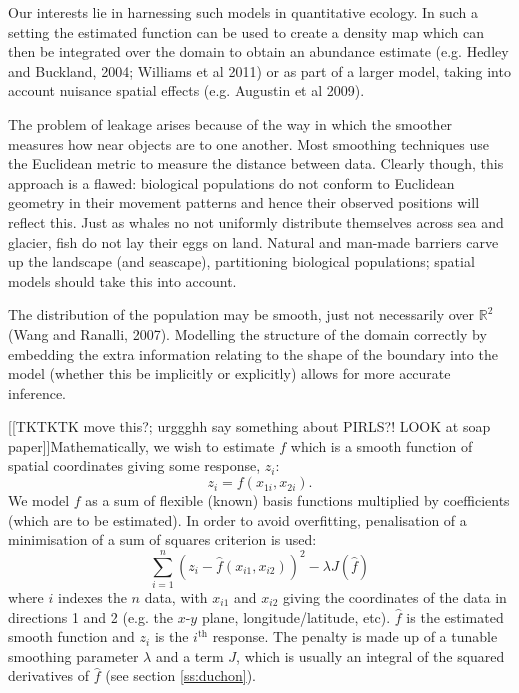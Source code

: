 \documentclass[useAMS, referee]{biom}
\begin{document}
Our interests lie in harnessing such models in quantitative ecology. In such a setting the estimated function can be used to create a density map which can then be integrated over the domain to obtain an abundance estimate (e.g. Hedley and Buckland, 2004; Williams et al 2011) or as part of a larger model, taking into account nuisance spatial effects (e.g. Augustin et al 2009). 


The problem of leakage arises because of the way in which the smoother measures how near objects are to one another. Most smoothing techniques use the Euclidean metric to measure the distance between data. Clearly though, this approach is a flawed: biological populations do not conform to Euclidean geometry in their movement patterns and hence their observed positions will reflect this. Just as whales no not uniformly distribute themselves across sea and glacier, fish do not lay their eggs on land. Natural and man-made barriers carve up the landscape (and seascape), partitioning biological populations; spatial models should take this into account.

The distribution of the population may be smooth, just not necessarily over $\mathbb{R}^2$ (Wang and Ranalli, 2007). Modelling the structure of the domain correctly by embedding the extra information relating to the shape of the boundary into the model (whether this be implicitly or explicitly) allows for more accurate inference.


[[TKTKTK move this?; urggghh say something about PIRLS?! LOOK at soap paper]]Mathematically, we wish to estimate $f$ which is a smooth function of spatial coordinates giving some response, $z_i$:
\begin{equation*}
z_i = f(x_{1i}, x_{2i}).
\end{equation*}
We model $f$ as a sum of flexible (known) basis functions multiplied by coefficients (which are to be estimated). In order to avoid overfitting, penalisation of a minimisation of a sum of squares criterion is used: 
\begin{equation}
\sum_{i=1}^n \left ( z_i - \hat{f}(x_{i1},x_{i2}) \right )^2 - \lambda J\left( \hat{f} \right)
\end{equation}
where $i$ indexes the $n$ data, with $x_{i1}$ and $x_{i2}$ giving the coordinates of the data in directions 1 and 2 (e.g. the $x$-$y$ plane, longitude/latitude, etc). $\hat{f}$ is the estimated smooth function and $z_i$ is the $i^\text{th}$ response. The penalty is made up of a tunable smoothing parameter $\lambda$ and a term $J$, which is usually an integral of the squared derivatives of $\hat{f}$ (see section \ref{ss:duchon}).
\end{document}

